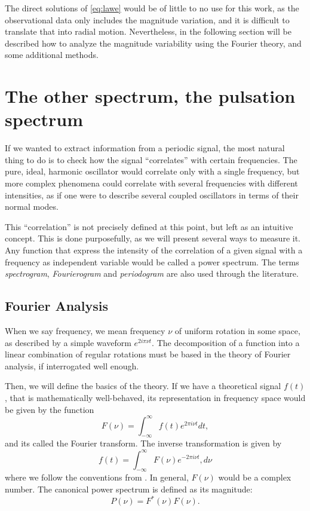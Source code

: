 	The direct solutions of \autoref{eq:lawe} would be of little to no use for this work, 
	as the observational data only includes the magnitude variation, 
	and it is difficult to translate that into radial motion.
	Nevertheless, in the following section will be described how to analyze the magnitude variability using the Fourier theory, and some additional methods.
	
	
\section{The other spectrum, the pulsation spectrum}

If we wanted to extract information from a periodic signal, 
the most natural thing to do is to check how the signal \enquote{correlates} with certain frequencies.
The pure, ideal, harmonic oscillator would correlate only with a single frequency,
but more complex phenomena could correlate with several frequencies with different intensities,
as if one were to describe several coupled oscillators in terms of their normal modes.

This \enquote{correlation} is not precisely defined at this point, but left as an intuitive concept.
This is done purposefully, as we will present several ways to measure it.
Any function that express the intensity of the correlation of a given signal with a frequency as independent variable
would be called a power spectrum. The terms \textit{spectrogram}, \textit{Fourierogram} and \textit{periodogram} are also used through the literature.

\subsection{Fourier Analysis}

When we say frequency, we mean frequency $\nu$ of uniform rotation in some space, as described by a simple waveform $e^{2i\pi \nu t}$.
The decomposition of a function into a linear combination of regular rotations must be based in the theory of Fourier analysis,
if interrogated well enough. 

Then, we will define the basics of the theory. If we have a theoretical signal $f(t)$, that is mathematically well-behaved,
its representation in frequency space would be given by the function
\begin{equation}
	F(\nu) = \int_{-\infty}^\infty f(t) e^{2\pi i \nu t} dt, \label{eq:fourier-transform}
\end{equation}
and its called the Fourier transform. The inverse transformation is given by 
\begin{equation}
	f(t) = \int_{-\infty}^{\infty} F(\nu) e^{-2\pi i \nu t}, d\nu
\end{equation}
where we follow the conventions from \cite{Deeming1975}. In general, $F(\nu)$ would be a complex number.
The canonical power spectrum is defined as its magnitude:
\begin{equation}
	P(\nu) = F^\ast(\nu) F(\nu). \label{eq:conjugate}
\end{equation}


